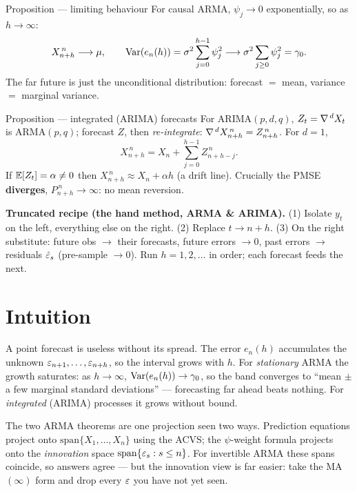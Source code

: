 \documentclass[11pt]{article}
\begin{document}
\begin{result}{Proposition --- limiting behaviour}
For causal ARMA, $\psi_j\to0$ exponentially, so as $h\to\infty$:
\[
X^{\,n}_{n+h}\longrightarrow\mu,
\qquad
\operatorname{Var}(e_n(h))=\sigma^2\sum_{j=0}^{h-1}\psi_j^2\longrightarrow\sigma^2\sum_{j\ge0}\psi_j^2=\gamma_0 .
\]
The far future is just the unconditional distribution: forecast $=$ mean, variance $=$ marginal
variance.
\end{result}

\begin{result}{Proposition --- integrated (ARIMA) forecasts}
For ARIMA$(p,d,q)$, $Z_t=\nabla^{\,d}X_t$ is ARMA$(p,q)$; forecast $Z$, then \emph{re-integrate}:
$\nabla^{\,d}X^{\,n}_{n+h}=Z^{\,n}_{n+h}$. For $d=1$,
\[
X^{\,n}_{n+h}=X_n+\sum_{j=0}^{h-1}Z^{\,n}_{n+h-j}.
\]
If $\mathbb{E}[Z_t]=\alpha\ne0$ then $X^{\,n}_{n+h}\approx X_n+\alpha h$ (a drift line). Crucially the
PMSE \textbf{diverges}, $P^{\,n}_{n+h}\to\infty$: no mean reversion.
\end{result}

\medskip
\textbf{Truncated recipe (the hand method, ARMA \& ARIMA).}
(1) Isolate $y_t$ on the left, everything else on the right. (2) Replace $t\to n+h$. (3) On the
right substitute: future obs $\to$ their forecasts, future errors $\to 0$, past errors $\to$
residuals $\hat{\varepsilon}_s$ (pre-sample $\to0$). Run $h=1,2,\dots$ in order; each forecast feeds the
next.

\section*{Intuition}

\begin{intu}
A point forecast is useless without its spread. The error $e_n(h)$ accumulates the unknown
$\varepsilon_{n+1},\dots,\varepsilon_{n+h}$, so the interval grows with $h$. For \emph{stationary} ARMA the
growth saturates: as $h\to\infty$, $\operatorname{Var}(e_n(h))\to\gamma_0$, so the band converges to
``mean $\pm$ a few marginal standard deviations'' --- forecasting far ahead beats nothing. For
\emph{integrated} (ARIMA) processes it grows without bound.
\end{intu}

\begin{intu}
The two ARMA theorems are one projection seen two ways. Prediction equations project onto
$\mathrm{span}\{X_1,\dots,X_n\}$ using the ACVS; the $\psi$-weight formula projects onto the
\emph{innovation} space $\mathrm{span}\{\varepsilon_s:s\le n\}$. For invertible ARMA these spans coincide,
so answers agree --- but the innovation view is far easier: take the MA$(\infty)$ form and drop every
$\varepsilon$ you have not yet seen.
\end{intu}
\end{document}
